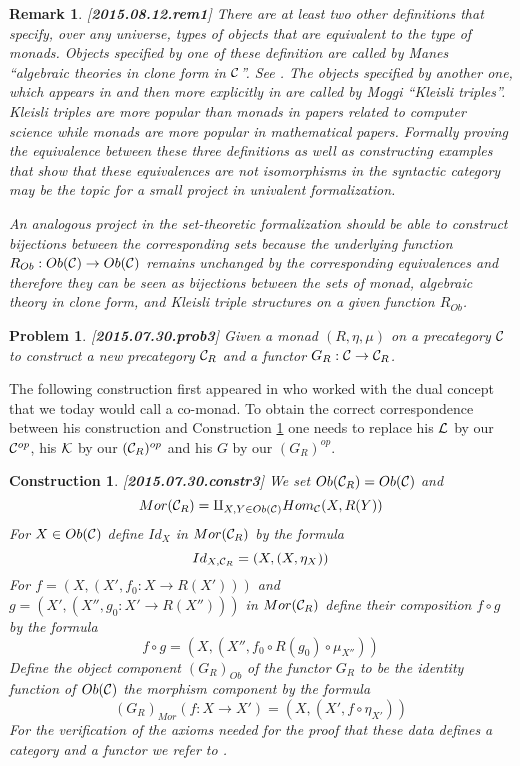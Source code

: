 \documentclass[11pt]{article}
\newtheorem{remark}[proposition]{Remark}
\newtheorem{problem}[proposition]{Problem}
\newtheorem{construction}[proposition]{Construction}
\newcommand{\llabel}[1]{\label{#1}[{\bf #1}]}
\newcommand{\sr}{\rightarrow}
\begin{document}
\begin{remark}\rm
\llabel{2015.08.12.rem1}
There are at least two other definitions that specify, over any universe, types of objects that are equivalent to the type of monads. Objects specified by one of these definition are called by Manes ``algebraic theories in clone form in $\cal C$''. See \cite[Def. 3.2, p.24]{Manes}. The objects specified by another one, which appears in \cite[Exercise 12, p.32]{Manes} and then more explicitly in \cite{Moggi91} are called by Moggi  ``Kleisli triples''. Kleisli triples are more popular than monads in papers related to computer science while monads are more popular in mathematical papers. Formally proving the equivalence between these three definitions as well as constructing examples that show that these equivalences are not isomorphisms in the syntactic category may be the topic for a small project in univalent formalization.

An analogous project in the set-theoretic formalization should be able to construct bijections between the corresponding sets because the underlying function $R_{Ob}:Ob({\cal C})\sr Ob({\cal C})$ remains unchanged by the corresponding equivalences and therefore they can be seen as bijections between the sets of monad, algebraic theory in clone form, and Kleisli triple structures on a given function $R_{Ob}$.
\end{remark} 
%
\begin{problem}
\llabel{2015.07.30.prob3}
Given a monad $(R,\eta,\mu)$ on a precategory $\cal C$ to construct a new precategory ${\cal C}_R$ and a functor $G_R:{\cal C}\sr {\cal C}_R$.
\end{problem}
%
The following construction first appeared in \cite{Kleisli} who worked with the dual concept that we today would call a co-monad. To obtain the correct correspondence between his construction and Construction \ref{2015.07.30.constr3} one needs to replace his $\cal L$ by our ${\cal C}^{op}$, his $\cal K$ by our $({\cal C}_R)^{op}$ and his $G$ by our $(G_R)^{op}$. 
%
\begin{construction}\rm
\llabel{2015.07.30.constr3}
We set $Ob({\cal C}_R)=Ob({\cal C})$ and
%
$$Mor({\cal C}_R)=\amalg_{X,Y\in Ob({\cal C})}Hom_{\cal C}(X, R(Y))$$
%
For $X\in Ob({\cal C})$ define $Id_X$ in $Mor({\cal C}_R)$ by the formula
%
$$Id_{X, {\cal C}_R}=(X,(X,\eta_X))$$
%
For $f=(X,(X',f_0:X\sr R(X')))$ and $g=(X',(X'',g_0:X'\sr R(X'')))$  in $Mor({\cal C}_R)$  define their composition $f\circ g$ by the formula
%
$$f\circ g=(X,(X'', f_0\circ R(g_0)\circ \mu_{X''}))$$
%
Define the object component $(G_R)_{Ob}$ of the functor $G_R$ to be the identity function of $Ob({\cal C})$ the morphism component by the formula
%
$$(G_R)_{Mor}(f:X\sr X')=(X,(X',f\circ \eta_{X'}))$$
%
For the verification of the axioms needed for the proof that these data defines a category and a functor we refer to  \cite{Kleisli}. 
\end{construction}
\end{document}
